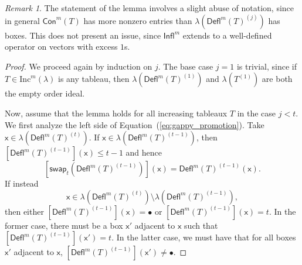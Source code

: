 \documentclass[12pt]{amsart}
\newcommand{\x}{\ensuremath{\mathsf{x}}}
\theoremstyle{definition}
\theoremstyle{remark}
\newtheorem{remark}[theorem]{Remark}
\numberwithin{equation}{section}
\renewcommand{\emptyset}{\varnothing}
\newcommand{\inc}{\ensuremath{\mathrm{Inc}}}
\newcommand{\swap}{\ensuremath{\mathsf{swap}}}
\newcommand{\rep}{\ensuremath{\mathsf{Rep}}}
\newcommand{\deflate}{\ensuremath{\mathsf{Defl}}}
\newcommand{\tinflate}{\ensuremath{\mathsf{Infl}}}
\newcommand{\content}{\ensuremath{\mathsf{Con}}}
\begin{document}
\begin{remark}The statement of the lemma involves a slight abuse of notation, since in general $\content^m(T)$ has more nonzero entries than $\lambda(\deflate^m(T)^{(j)})$ has boxes. This does not present an issue, since $\tinflate^m$ extends to a well-defined operator on vectors with excess $1$s.
\end{remark}
\begin{proof}  We proceed again by induction on $j$. The base case $j=1$ is trivial, since if $T \in \inc^m(\lambda)$ is any tableau, then $\lambda \left( \deflate^m(T)^{(1)} \right)$ and $\lambda \left( T^{(1)} \right)$ are both the empty order ideal.

Now, assume that the lemma holds for all increasing tableaux $T$ in the case $j < t$. We first analyze the left side of Equation~(\ref{eq:gappy_promotion}). Take $\x \in \lambda\left( \deflate^m(T)^{(t)} \right)$. If $\x \in \lambda\left( \deflate^m(T)^{(t-1)} \right)$, then 
$[\deflate^m(T)^{(t-1)}](\x) \leq t-1$ and hence
\[
\left[ \swap_{t}(\deflate^m(T)^{(t-1)})\right](\x) = \deflate^m(T)^{(t-1)}(\x).
\]
 If instead
 \[\x \in \lambda\left(\deflate^m(T)^{(t)}\right) \setminus \lambda\left(\deflate^m(T)^{(t-1)}\right),\]
  then either $[\deflate^m(T)^{(t-1)}](\x) = \bullet$ or $[\deflate^m(T)^{(t-1)}](\x) = t$. In the former case, there must be a box $\x'$ adjacent to $\x$ such that $[\deflate^m(T)^{(t-1)}](\x') = t$. In the latter case, we must have that for all boxes $\x'$ adjacent to $\x$, $[\deflate^m(T)^{(t-1)}](\x') \neq \bullet$. 


\end{proof}
\end{document}
